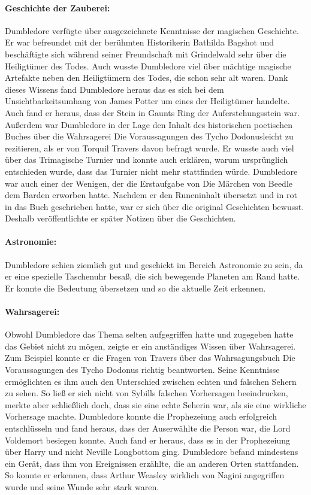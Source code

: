 \documentclass[a4paper, 10pt]{article}
\begin{document}
\paragraph{Geschichte der Zauberei:}
Dumbledore verfügte über ausgezeichnete Kenntnisse der magischen Geschichte. Er war befreundet mit der berühmten Historikerin Bathilda Bagshot und beschäftigte sich während seiner Freundschaft mit Grindelwald sehr über die Heiligtümer des Todes. Auch wusste Dumbledore viel über mächtige magische Artefakte neben den Heiligtümern des Todes, die schon sehr alt waren. Dank dieses Wissens fand Dumbledore heraus das es sich bei dem Unsichtbarkeitsumhang von James Potter um eines der Heiligtümer handelte. Auch fand er heraus, dass der Stein in Gaunts Ring der Auferstehungsstein war. Außerdem war Dumbledore in der Lage den Inhalt des historischen poetischen Buches über die Wahrsagerei Die Voraussagungen des Tycho Dodonusleicht zu rezitieren, als er von Torquil Travers davon befragt wurde. Er wusste auch viel über das Trimagische Turnier und konnte auch erklären, warum ursprünglich entschieden wurde, dass das Turnier nicht mehr stattfinden würde. Dumbledore war auch einer der Wenigen, der die Erstaufgabe von Die Märchen von Beedle dem Barden erworben hatte. Nachdem er den Runeninhalt übersetzt und in rot in das Buch geschrieben hatte, war er sich über die original Geschichten bewusst. Deshalb veröffentlichte er später Notizen über die Geschichten.
\paragraph{Astronomie:}
Dumbledore schien ziemlich gut und geschickt im Bereich Astronomie zu sein, da er eine spezielle Taschenuhr besaß, die sich bewegende Planeten am Rand hatte. Er konnte die Bedeutung übersetzen und so die aktuelle Zeit erkennen.
\paragraph{Wahrsagerei:}
Obwohl Dumbledore das Thema selten aufgegriffen hatte und zugegeben hatte das Gebiet nicht zu mögen, zeigte er ein anständiges Wissen über Wahrsagerei. Zum Beispiel konnte er die Fragen von Travers über das Wahrsagungsbuch Die Voraussagungen des Tycho Dodonus richtig beantworten. Seine Kenntnisse ermöglichten es ihm auch den Unterschied zwischen echten und falschen Sehern zu sehen. So ließ er sich nicht von Sybills falschen Vorhersagen beeindrucken, merkte aber schließlich doch, dass sie eine echte Seherin war, als sie eine wirkliche Vorhersage machte. Dumbledore konnte die Prophezeiung auch erfolgreich entschlüsseln und fand heraus, dass der Auserwählte die Person war, die Lord Voldemort besiegen konnte. Auch fand er heraus, dass es in der Prophezeiung über Harry und nicht Neville Longbottom ging. Dumbledore befand mindestens ein Gerät, dass ihm von Ereignissen erzählte, die an anderen Orten stattfanden. So konnte er erkennen, dass Arthur Weasley wirklich von Nagini angegriffen wurde und seine Wunde sehr stark waren.
\end{document}

